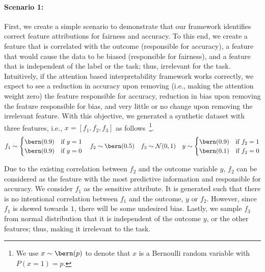 \paragraph{Scenario 1:} First, we create a simple scenario to demonstrate that our framework identifies correct feature attributions for fairness and accuracy. To this end, we create a feature that is correlated with the outcome (responsible for accuracy), a feature that would cause the data to be biased (responsible for fairness), and a feature that is independent of the label or the task; thus, irrelevant for the task. Intuitively, if the attention based interpretability framework works correctly, we expect to see a reduction in accuracy upon removing (i.e., making the attention weight zero) the feature responsible  for accuracy, reduction in bias upon removing the feature responsible for bias, and very little or no change upon removing the irrelevant feature. With this objective, we generated a synthetic dataset with three features, i.e., $x = [f_1, f_2, f_3]$ as follows~\footnote{We use $x\sim \bern(p)$ to denote that $x$  is a Bernoulli random variable with $P(x=1)=p$.}.
\begin{equation*}
    f_1\sim \begin{cases}
        \bern(0.9) & \text{if } y=1\\
        \bern(0.9) & \text{if } y=0
    \end{cases}
    \quad f_2\sim \bern(0.5)
    \quad f_3\sim \mathcal N (0,1)
    \quad y\sim \begin{cases}
        \bern(0.9) & \text{if } f_2=1\\
        \bern(0.1) & \text{if } f_2=0
    \end{cases}
\end{equation*}

Due to the existing correlation between $f_2$ and the outcome variable $y$, $f_2$ can be considered as the feature with the most predictive information and responsible for accuracy. We consider $f_1$ as the sensitive attribute. It is generated such that there is no intentional correlation between $f_1$ and the outcome, $y$ or $f_2$. However, since $f_1$ is skewed towards $1$, there will be some undesired bias. Lastly, we sample $f_3$ from normal distribution that it is independent of  the outcome $y$, or the other features; thus, making it  irrelevant to the task.

